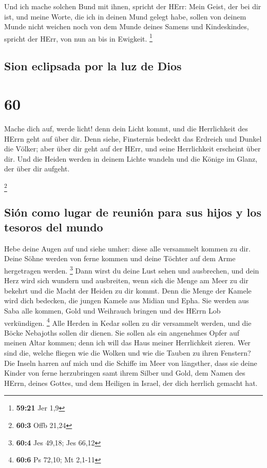  Und ich mache solchen Bund mit ihnen, spricht der HErr:
Mein Geist, der bei dir ist, und meine Worte, die ich in deinen Mund
gelegt habe, sollen von deinem Munde nicht weichen noch von dem Munde
deines Samens und Kindeskindes, spricht der HErr, von nun an bis in
Ewigkeit. \footnote{\textbf{59:21} Jer 1,9}

\hypertarget{sion-eclipsada-por-la-luz-de-dios}{%
\subsection{Sion eclipsada por la luz de
Dios}\label{sion-eclipsada-por-la-luz-de-dios}}

\hypertarget{section-59}{%
\section{60}\label{section-59}}

 Mache dich auf, werde licht! denn dein Licht kommt, und
die Herrlichkeit des HErrn geht auf über dir.  Denn siehe,
Finsternis bedeckt das Erdreich und Dunkel die Völker; aber über dir
geht auf der HErr, und seine Herrlichkeit erscheint über dir.
 Und die Heiden werden in deinem Lichte wandeln und die
Könige im Glanz, der über dir aufgeht.

\footnote{\textbf{60:3} Offb 21,24}

\hypertarget{siuxf3n-como-lugar-de-reuniuxf3n-para-sus-hijos-y-los-tesoros-del-mundo}{%
\subsection{Sión como lugar de reunión para sus hijos y los tesoros del
mundo}\label{siuxf3n-como-lugar-de-reuniuxf3n-para-sus-hijos-y-los-tesoros-del-mundo}}

 Hebe deine Augen auf und siehe umher: diese alle
versammelt kommen zu dir. Deine Söhne werden von ferne kommen und deine
Töchter auf dem Arme hergetragen werden. \footnote{\textbf{60:4} Jes
  49,18; Jes 66,12}  Dann wirst du deine Lust sehen und
ausbrechen, und dein Herz wird sich wundern und ausbreiten, wenn sich
die Menge am Meer zu dir bekehrt und die Macht der Heiden zu dir kommt.
 Denn die Menge der Kamele wird dich bedecken, die jungen
Kamele aus Midian und Epha. Sie werden aus Saba alle kommen, Gold und
Weihrauch bringen und des HErrn Lob verkündigen. \footnote{\textbf{60:6}
  Ps 72,10; Mt 2,1-11}  Alle Herden in Kedar sollen zu dir
versammelt werden, und die Böcke Nebajoths sollen dir dienen. Sie sollen
als ein angenehmes Opfer auf meinen Altar kommen; denn ich will das Haus
meiner Herrlichkeit zieren.  Wer sind die, welche fliegen
wie die Wolken und wie die Tauben zu ihren Fenstern?  Die
Inseln harren auf mich und die Schiffe im Meer von längsther, dass sie
deine Kinder von ferne herzubringen samt ihrem Silber und Gold, dem
Namen des HErrn, deines Gottes, und dem Heiligen in Israel, der dich
herrlich gemacht hat.

